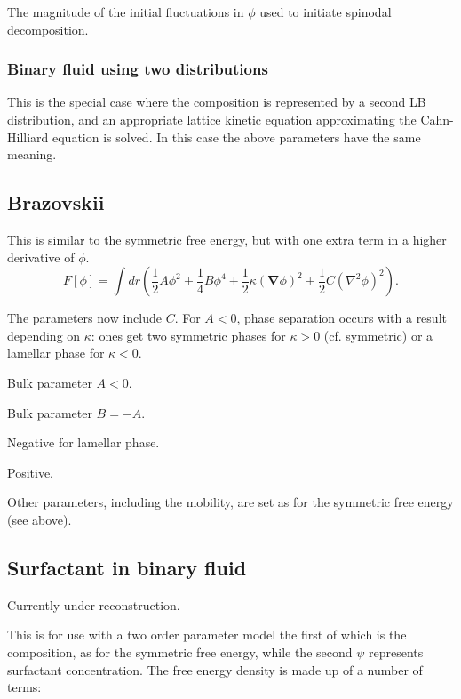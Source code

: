 The magnitude of the initial fluctuations in $\phi$ used to
initiate spinodal decomposition.

\subsubsection{Binary fluid using two distributions}


This is the special case where the composition is represented
by a second LB distribution, and an appropriate lattice kinetic
equation approximating the Cahn-Hilliard equation is solved.
In this case the above parameters have the same meaning.


\subsection{Brazovskii}


This is similar to the symmetric free energy, but with one extra term
in a higher derivative of $\phi$.
\begin{equation}
 F[\phi] = 
\int dr \left(
{\textstyle \frac{1}{2}}A\phi^2
+ {\textstyle \frac{1}{4}}B\phi^4
+ {\textstyle \frac{1}{2}}\kappa (\mathbf{\nabla}\phi)^2
+ {\textstyle \frac{1}{2}} C (\nabla^2 \phi)^2 \right).
\end{equation}

The parameters now include $C$. For $A<0$, phase separation occurs
with a result depending on $\kappa$: ones get two symmetric phases
for $\kappa >0$ (cf. symmetric) or a lamellar phase for
$\kappa < 0$.

 Bulk parameter $A < 0$.

 Bulk parameter $B = -A$.

 Negative for lamellar phase.

 Positive.

Other parameters, including the mobility, are set as for the
symmetric free energy (see above).


\subsection{Surfactant in binary fluid}


Currently under reconstruction.

This is for use with a two order parameter model the first of
which is the composition, as for the symmetric free energy,
while the second $\psi$ represents surfactant concentration.
The free energy density is made up of a number of terms:

